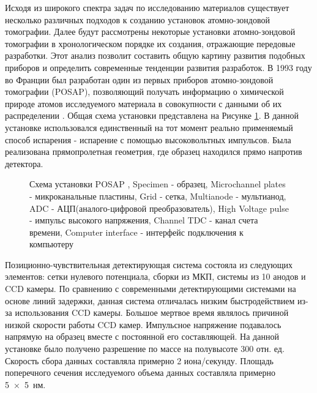 Исходя из широкого спектра задач по исследованию материалов существует несколько различных подходов к созданию установок атомно-зондовой томографии. Далее будут рассмотрены некоторые установки атомно-зондовой томографии в хронологическом порядке их создания, отражающие передовые разработки. Этот анализ позволит составить общую картину развития подобных приборов и определить современные тенденции развития разработок. В 1993 году во Франции был разработан один из первых приборов атомно-зондовой томографии (POSAP), позволяющий получать информацию о химической природе атомов исследуемого материала в совокупности с данными об их распределении  \cite{Deconihout93}. Общая схема установки представлена на Рисунке \cref{fig:POSAP}. В данной установке использовался единственный на тот момент реально применяемый способ испарения - испарение с помощью высоковольтных импульсов. Была реализована прямопролетная геометрия, где образец находился прямо напротив детектора.

\begin{figure}[htb]
	\caption{Схема установки POSAP \cite{Deconihout93}, Specimen - образец, Microchannel plates - микроканальные пластины, Grid - сетка, Multianode - мультианод, ADC - АЦП(аналого-цифровой преобразователь), High Voltage pulse - импульс высокого напряжения, Channel TDC - канал счета времени, Computer interface - интерфейс подключения к компьютеру}
	\label{fig:POSAP}
\end{figure}

Позиционно-чувствительная детектирующая система состояла из следующих элементов: сетки нулевого потенциала, сборки из МКП, системы из 10 анодов и CCD камеры. По сравнению с современными детектирующими системами на основе линий задержки, данная система отличалась низким быстродействием из-за использования CCD камеры. Большое мертвое время являлось причиной низкой скорости работы CCD камер. Импульсное напряжение  подавалось напрямую на образец вместе с постоянной его составляющей. На данной установке было получено разрешение по массе на полувысоте 300 отн. ед. Скорость сбора данных составляла примерно 2 иона/секунду. Площадь поперечного сечения исследуемого объема данных составляла примерно 5~×~5~нм.

